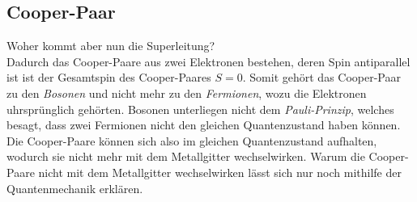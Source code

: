 \subsection{Cooper-Paar}
Woher kommt aber nun die Superleitung? \\
Dadurch das Cooper-Paare aus zwei Elektronen bestehen, deren Spin antiparallel ist ist der Gesamtspin des Cooper-Paares $S=0$.
Somit gehört das Cooper-Paar zu den \textit{Bosonen} und nicht mehr zu den \textit{Fermionen}, wozu die Elektronen uhrsprünglich gehörten.
Bosonen unterliegen nicht dem \textit{Pauli-Prinzip}, welches besagt, dass zwei Fermionen nicht den gleichen Quantenzustand haben können.
Die Cooper-Paare können sich also im gleichen Quantenzustand aufhalten, wodurch sie nicht mehr mit dem Metallgitter wechselwirken.
Warum die Cooper-Paare nicht mit dem Metallgitter wechselwirken lässt sich nur noch mithilfe der Quantenmechanik erklären. \\
\\
